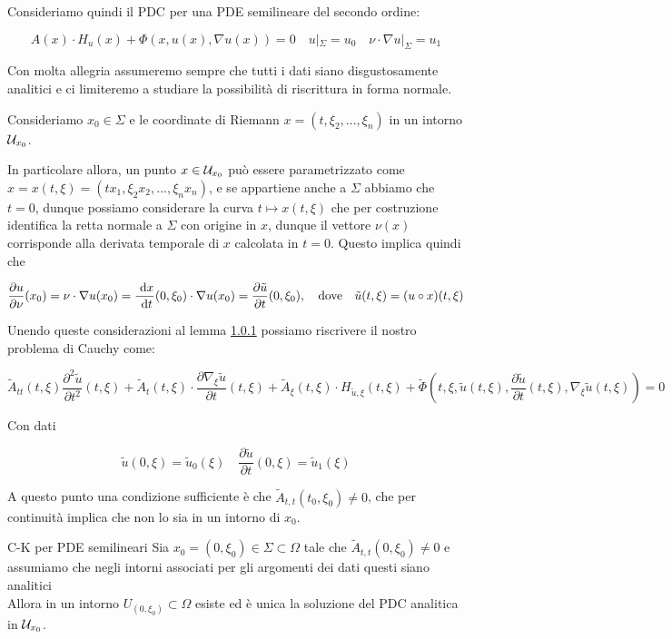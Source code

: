 \documentclass{book}
\begin{document}
Consideriamo quindi il PDC per una PDE semilineare del secondo ordine:

\[A(x)\cdot H_u(x) + \Phi(x,u(x),\nabla u(x)) = 0 \quad u|_\Sigma = u_0 \quad \nu \cdot \nabla u|_\Sigma = u_1\]

Con molta allegria assumeremo sempre che tutti i dati siano disgustosamente analitici e ci limiteremo a studiare la possibilità di riscrittura in forma normale.

Consideriamo $x_0 \in \Sigma$ e le coordinate di Riemann $x = (t,\xi_2,...,\xi_n)$ in un intorno $\mathcal{U}_{x_0}$.

In particolare allora, un punto $x \in \mathcal{U}_{x_0}$ può essere parametrizzato come $x = x(t,\xi) = (t x_1 , \xi_2 x_2,...,\xi_n x_n )$, e se appartiene anche a $\Sigma$ abbiamo che $t=0$, dunque possiamo considerare la curva $t\mapsto x(t,\xi)$ che per costruzione identifica la retta normale a $\Sigma$ con origine in $x$, dunque il vettore $\nu(x)$ corrisponde alla derivata temporale di $x$ calcolata in $t=0$. Questo implica quindi che

\[\frac{\partial u}{\partial \nu} (x_0) = \nu \cdot \nabla u(x_0) = \frac{\text{ d} x}{\text{ d} t}(0,\xi_0) \cdot \nabla u(x_0) = \frac{\partial \tilde{u}}{\partial t}(0,\xi_0), \quad \text{dove} \quad \tilde{u}(t,\xi) = (u\circ x)(t,\xi)\]

Unendo queste considerazioni al lemma \href{lem:1.0.1}{1.0.1} possiamo riscrivere il nostro problema di Cauchy come:

\[\tilde{A}_{tt}(t,\xi) \frac{\partial^2 \tilde{u}}{\partial t^2}(t,\xi) + \tilde{A}_t(t,\xi)\cdot \frac{\partial \nabla_\xi \tilde{u}}{\partial t}(t,\xi) + \tilde{A}_\xi(t,\xi) \cdot H_{\tilde{u},\xi}(t,\xi) +  \tilde{\Phi}\left(t,\xi,\tilde{u}(t,\xi), \frac{\partial \tilde{u}}{\partial t}(t,\xi), \nabla_\xi \tilde{u}(t,\xi)\right) = 0\]

Con dati 

\[\tilde{u}(0,\xi) = \tilde{u}_0(\xi) \quad \frac{\partial \tilde{u}}{\partial t}(0,\xi) = \tilde{u}_1(\xi)\]

A questo punto una condizione sufficiente è che $\tilde{A}_{t,t}(t_0,\xi_0)\neq 0$, che per continuità implica che non lo sia in un intorno di $x_0$.

\begin{corollary}{C-K per PDE semilineari}{}
    Sia $x_0 = (0,\xi_0)\in\Sigma\subset \Omega$ tale che $\tilde{A}_{t,t}(0,\xi_0)\neq 0$ e assumiamo che negli intorni associati per gli argomenti dei dati questi siano analitici\\
    Allora in un intorno $U_{(0,\xi_0)}\subset\Omega$ esiste ed è unica la soluzione del PDC analitica in $\mathcal{U}_{x_0}$.
\end{corollary}
\end{document}
